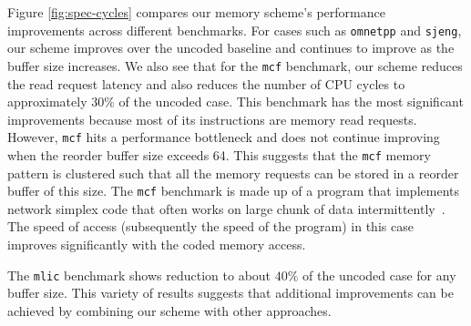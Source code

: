 Figure \ref{fig:spec-cycles} compares our memory scheme's performance improvements across different benchmarks. 
For cases such as \texttt{omnetpp} and \texttt{sjeng}, our scheme improves over the uncoded baseline and continues to improve as the buffer size increases.
We also see that for the \texttt{mcf} benchmark, our scheme reduces the read request latency and also reduces the number of CPU cycles to approximately $30\%$ of the uncoded case. This benchmark has the most significant improvements because most of its instructions are memory read requests. 
However, \texttt{mcf} hits a performance bottleneck and does not continue improving when the reorder buffer size exceeds 64. This suggests that the \texttt{mcf} memory pattern is clustered such that all the memory requests can be stored in a reorder buffer of this size. The \texttt{mcf} benchmark is made up of a program that implements network simplex code that often works on large chunk of data intermittently~\cite{mcf}. The speed of access (subsequently the speed of the program) in this case improves significantly with the coded memory access.

The \texttt{mlic} benchmark shows reduction to about $40\%$ of the uncoded case for any buffer size. This variety of results suggests that additional improvements can be achieved by combining our scheme with other approaches.




